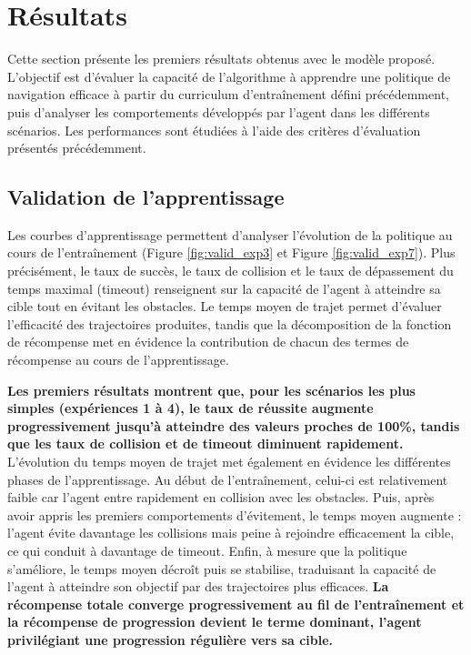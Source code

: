 \section{Résultats}

\begin{tcolorbox}[colback=black!5,colframe=black,title=]
    Cette section présente les premiers résultats obtenus avec le modèle proposé. L'objectif est d'évaluer la capacité de l'algorithme à apprendre une politique de navigation efficace à partir du curriculum d'entraînement défini précédemment, puis d'analyser les comportements développés par l'agent dans les différents scénarios. Les performances sont étudiées à l'aide des critères d'évaluation présentés précédemment.
\end{tcolorbox}



\subsection{Validation de l'apprentissage}

\noindent Les courbes d'apprentissage permettent d'analyser l'évolution de la politique au cours de l'entraînement (Figure \ref{fig:valid_exp3} et Figure \ref{fig:valid_exp7}). Plus précisément, le taux de succès, le taux de collision et le taux de dépassement du temps maximal (timeout) renseignent sur la capacité de l'agent à atteindre sa cible tout en évitant les obstacles. Le temps moyen de trajet permet d'évaluer l'efficacité des trajectoires produites, tandis que la décomposition de la fonction de récompense met en évidence la contribution de chacun des termes de récompense au cours de l'apprentissage.

\vspace{10pt}

\noindent \textbf{Les premiers résultats montrent que, pour les scénarios les plus simples (expériences 1 à 4), le taux de réussite augmente progressivement jusqu'à atteindre des valeurs proches de 100\%, tandis que les taux de collision et de timeout diminuent rapidement.} L'évolution du temps moyen de trajet met également en évidence les différentes phases de l'apprentissage. Au début de l'entraînement, celui-ci est relativement faible car l'agent entre rapidement en collision avec les obstacles. Puis, après avoir appris les premiers comportements d'évitement, le temps moyen augmente : l'agent évite davantage les collisions mais peine à rejoindre efficacement la cible, ce qui conduit à davantage de timeout. Enfin, à mesure que la politique s'améliore, le temps moyen décroît puis se stabilise, traduisant la capacité de l'agent à atteindre son objectif par des trajectoires plus efficaces. \textbf{La récompense totale converge progressivement au fil de l'entraînement et la récompense de progression devient le terme dominant, l'agent privilégiant une progression régulière vers sa cible.}

